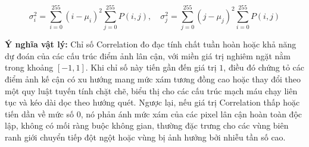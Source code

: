 \begin{equation}
    \sigma_i^2 = \sum_{i=0}^{255} (i - \mu_i)^2 \sum_{j=0}^{255} P(i, j), \quad \sigma_j^2 = \sum_{j=0}^{255} (j - \mu_j)^2 \sum_{i=0}^{255} P(i, j)
\end{equation}

\textbf{Ý nghĩa vật lý:} Chỉ số Correlation đo đạc tính chất tuần hoàn hoặc khả năng dự đoán của các cấu trúc điểm ảnh lân cận, với miền giá trị nghiêm ngặt nằm trong khoảng $[-1, 1]$. Khi chỉ số này tiến gần đến giá trị $1$, điều đó chứng tỏ các điểm ảnh kế cận có xu hướng mang mức xám tương đồng cao hoặc thay đổi theo một quy luật tuyến tính chặt chẽ, biểu thị cho các cấu trúc mạch máu chạy liên tục và kéo dài dọc theo hướng quét. Ngược lại, nếu giá trị Correlation thấp hoặc tiến dần về mức số $0$, nó phản ánh mức xám của các pixel lân cận hoàn toàn độc lập, không có mối ràng buộc không gian, thường đặc trưng cho các vùng biên ranh giới chuyển tiếp đột ngột hoặc vùng bị ảnh hưởng bởi nhiễu tần số cao.
